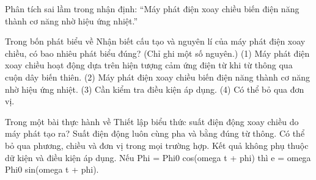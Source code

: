 \begin{bt}
Phân tích sai lầm trong nhận định: “Máy phát điện xoay chiều biến điện năng thành cơ năng nhờ hiệu ứng nhiệt.”
\end{bt}

\begin{ex}
Trong bốn phát biểu về Nhận biết cấu tạo và nguyên lí của máy phát điện xoay chiều, có bao nhiêu phát biểu đúng? (Chỉ ghi một số nguyên.) (1) Máy phát điện xoay chiều hoạt động dựa trên hiện tượng cảm ứng điện từ khi từ thông qua cuộn dây biến thiên. (2) Máy phát điện xoay chiều biến điện năng thành cơ năng nhờ hiệu ứng nhiệt. (3) Cần kiểm tra điều kiện áp dụng. (4) Có thể bỏ qua đơn vị.
\end{ex}

\begin{ex}
Trong một bài thực hành về Thiết lập biểu thức suất điện động xoay chiều do máy phát tạo ra?
\choice
{Suất điện động luôn cùng pha và bằng đúng từ thông.}
{Có thể bỏ qua phương, chiều và đơn vị trong mọi trường hợp.}
{Kết quả không phụ thuộc dữ kiện và điều kiện áp dụng.}
{\True Nếu Phi = Phi0 cos(omega t + phi) thì e = omega Phi0 sin(omega t + phi).}
\end{ex}

